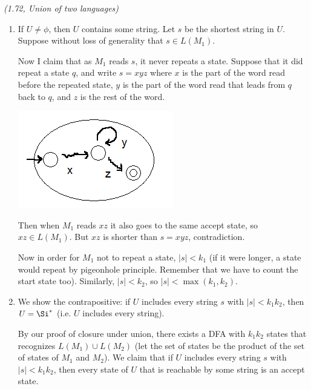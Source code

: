 \begin{problem}{\it(1.72, Union of two languages)}
\begin{enumerate}
\item
If $U\ne \phi$, then $U$ contains some string. Let $s$ be the shortest string in $U$. Suppose without loss of generality that $s\in L(M_1)$. 

Now I claim that as $M_1$ reads $s$, it never repeats a state. Suppose that it did repeat a state $q$, and write $s=xyz$ where $x$ is the part of the word read before the repeated state, $y$ is the part of the word read that leads from $q$ back to $q$, and $z$ is the rest of the word.

\begin{center}
\includegraphics{../18.404/3-6}
\end{center}

Then when $M_1$ reads $xz$ it also goes to the same accept state, so $xz\in L(M_1)$. But $xz$ is shorter than $s=xyz$, contradiction.

Now in order for $M_1$ not to repeat a state, $|s|<k_1$ (if it were longer, a state would repeat by pigeonhole principle. Remember that we have to count the start state too). Similarly, $|s|<k_2$, so $|s|<\max(k_1,k_2)$.
\item
We show the contrapositive: if $U$ includes every string $s$ with $|s|<k_1k_2$, then $U=\Si^*$ (i.e. $U$ includes every string). 

By our proof of closure under union, there exists a DFA with $k_1k_2$ states that recognizes $L(M_1)\cup L(M_2)$ (let the set of states be the product of the set of states of $M_1$ and $M_2$). We claim that if $U$ includes every string $s$ with $|s|<k_1k_2$, then every state of $U$ that is reachable by some string is an accept state.


\end{enumerate}
\end{problem}
